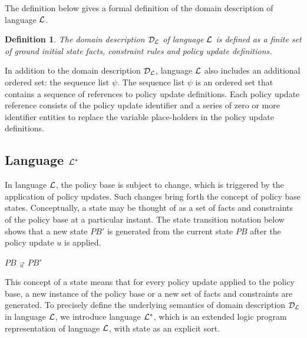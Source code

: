 \documentclass[11pt]{report}
\newtheorem{vdefinition}{Definition}[chapter]
\newenvironment{vquote}
{
  \begin{list}{}{\leftmargin 1em}\item[]
}
{
  \end{list}
}
\begin{document}
        The definition below gives a formal definition of the domain
        description of language ${\cal L}$.

        \begin{vdefinition}
          \label{defn-langl-domai}
          The domain description ${\cal D}_{\cal L}$ of language ${\cal L}$
          is defined as a finite set of ground initial state facts,
          constraint rules and policy update definitions.
        \end{vdefinition}

        In addition to the domain description ${\cal D}_{\cal L}$, language
        ${\cal L}$ also includes an additional ordered set: the sequence list
        $\psi$. The sequence list $\psi$ is an ordered set that contains a
        sequence of references to policy update definitions. Each policy
        update reference consists of the policy update identifier and a
        series of zero or more identifier entities to replace the variable
        place-holders in the policy update definitions.

      \subsection{Language ${\cal L}^{*}$}
        \label{subs-langl-langl}

        In language ${\cal L}$, the policy base is subject to change, which
        is triggered by the application of policy updates. Such changes bring
        forth the concept of policy base states. Conceptually, a state may be
        thought of as a set of facts and constraints of the policy base at a
        particular instant. The state transition notation below shows that a
        new state $PB'$ is generated from the current state $PB$ after the
        policy update $u$ is applied.

        \begin{vquote}
          $PB$ $\overrightarrow{_{u}}$ $PB'$
        \end{vquote}

        This concept of a state means that for every policy update applied
        to the policy base, a new instance of the policy base or a new set of
        facts and constraints are generated. To precisely define the
        underlying semantics of domain description ${\cal D}_{\cal L}$ in
        language ${\cal L}$, we introduce language ${\cal L}^{*}$, which is
        an extended logic program representation of language ${\cal L}$, with
        state as an explicit sort.
\end{document}

